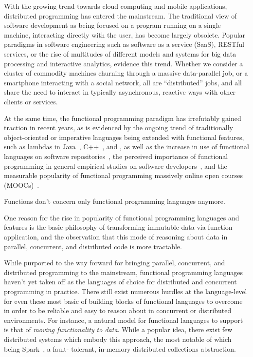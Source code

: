 \documentclass{llncs}
\begin{document}
With the growing trend towards cloud computing and mobile applications,
distributed programming has entered the mainstream. The traditional view of
software development as being focused on a program running on a single
machine, interacting directly with the user, has become largely obsolete.
Popular paradigms in software engineering such as software as a service
(SaaS), RESTful services, or the rise of multitudes of different models and
systems for big data processing and interactive analytics, evidence this
trend.
Whether we consider a cluster of commodity machines
churning through a massive data-parallel job, or a smartphone interacting with
a social network, all are ``distributed'' jobs, and all share the need to
interact in typically asynchronous, reactive ways with other clients or
services.  

At the same time, the functional programming paradigm has irrefutably gained
traction in recent years, as is evidenced by the ongoing trend of
traditionally object-oriented or imperative languages being extended with
functional features, such as lambdas in Java~\cite{JavaLambdas},
C++~\cite{CplusplusLambas}, and , as well as the increase in
use of functional languages on software repositories~\cite{find-something},
the perceived importance of functional programming in general empirical
studies on software developers~\cite{PLAdoption}, and the measurable popularity of functional programming massively
online open courses (MOOCs)~\cite{ICSEMOOC}.

Functions don't concern only functional programming languages anymore.

One reason for the rise in
popularity of functional programming languages and features is the basic
philosophy of transforming immutable data via function application, and the
observation that this mode of reasoning about data in parallel, concurrent,
and distributed code is more tractable.


While purported to the way forward for bringing parallel, concurrent, and
distributed programming to the mainstream, functional programming languages
haven't yet taken off as the languages of choice for distributed and
concurrent programming in practice. There still exist numerous hurdles at the
language-level for even these most basic of building blocks of functional
languages to overcome in order to be reliable and easy to reason about in
concurrent or distributed environments. For instance, a natural model for
functional languages to support is that of {\em moving functionality to
data}. While a popular idea, there exist few distributed systems which embody
this approach, the most notable of which being Spark~\cite{Spark}, a fault-
tolerant, in-memory distributed collections abstraction.
\end{document}
